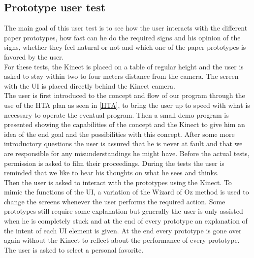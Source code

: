 \subsection{Prototype user test}

The main goal of this user test is to see how the user interacts with the different paper prototypes, how fast can he do the required signs and his opinion of the signs, whether they feel natural or not and which one of the paper prototypes is favored by the user. \\

For these tests, the Kinect is placed on a table of regular height and the user is asked to stay within two to four meters distance from the camera. The screen with the UI is placed directly behind the Kinect camera.\\

The user is first introduced to the concept and flow of our program through the use of the HTA plan as seen in \ref{HTA}, to bring the user up to speed with what is necessary to operate the eventual program. Then a small demo program is presented showing the capabilities of the concept and the Kinect to give him an idea of the end goal and the possibilities with this concept. After some more introductory questions the user is assured that he is never at fault and that we are responsible for any misunderstandings he might have. Before the actual tests, permission is asked to film their proceedings. During the tests the user is reminded that we like to hear his thoughts on what he sees and thinks.\\

Then the user is asked to interact with the prototypes using the Kinect. To mimic the functions of the UI, a variation of the Wizard of Oz method \cite{WizardOfOz} is used to change the screens whenever the user performs the required action. Some prototypes still require some explanation but generally the user is only assisted when he is completely stuck and at the end of every prototype an explanation of the intent of each UI element is given. At the end every prototype is gone over again without the Kinect to reflect about the performance of every prototype. The user is asked to select a personal favorite.\\

